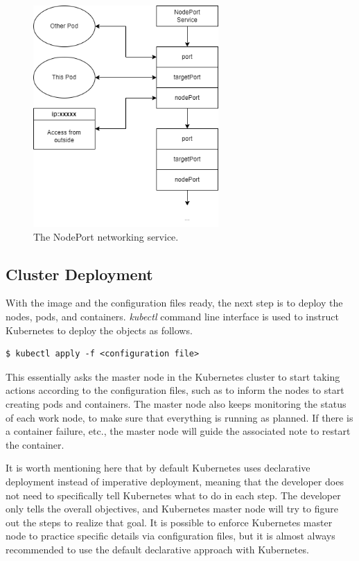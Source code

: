 \begin{figure}[htbp]
	\centering
	\includegraphics[width=200pt]{chapters/part-3/figures/nodeport.png}
	\caption{The NodePort networking service.} \label{ch:vac:fig:nodeport}
\end{figure}

\subsection{Cluster Deployment}

With the image and the configuration files ready, the next step is to deploy the nodes, pods, and containers. \textit{kubectl} command line interface is used to instruct Kubernetes to deploy the objects as follows.
\begin{lstlisting}
$ kubectl apply -f <configuration file>
\end{lstlisting}
This essentially asks the master node in the Kubernetes cluster to start taking actions according to the configuration files, such as to inform the nodes to start creating pods and containers. The master node also keeps monitoring the status of each work node, to make sure that everything is running as planned. If there is a container failure, etc., the master node will guide the associated note to restart the container.

It is worth mentioning here that by default Kubernetes uses declarative deployment instead of imperative deployment, meaning that the developer does not need to specifically tell Kubernetes what to do in each step. The developer only tells the overall objectives, and Kubernetes master node will try to figure out the steps to realize that goal. It is possible to enforce Kubernetes master node to practice specific details via configuration files, but it is almost always recommended to use the default declarative approach with Kubernetes.

